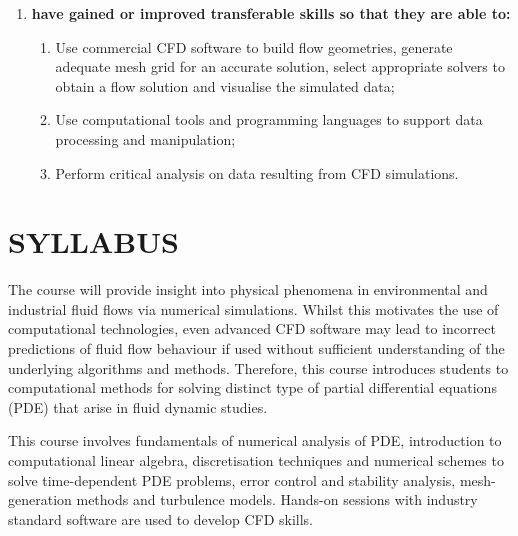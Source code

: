 \documentclass[12pts,a4paper,amsmath,amssymb,floatfix]{article}%
\begin{document}
\begin{enumerate}[{\bf A.}]
%
\item {\bf have gained or improved transferable skills so that they are able to:}
  \begin{enumerate}
    \item Use commercial CFD software to build flow geometries, generate adequate mesh grid for an accurate solution, select appropriate solvers to obtain a flow solution and visualise the simulated data;
    \item Use computational tools and programming languages to support data processing and manipulation; 
    \item Perform critical analysis on data resulting from CFD simulations.
  \end{enumerate}
\end{enumerate}


\section{SYLLABUS}
The course will provide insight into physical phenomena in environmental and industrial fluid flows via numerical simulations. Whilst this motivates the use of computational technologies, even advanced CFD software may lead to incorrect predictions of fluid flow behaviour if used without sufficient understanding of the underlying algorithms and methods. Therefore, this course introduces students to computational methods for solving distinct type of partial differential equations (PDE) that arise in fluid dynamic studies.

This course involves fundamentals of numerical analysis of PDE, introduction to computational linear algebra, discretisation techniques and numerical schemes to solve time-dependent PDE problems, error control and stability analysis, mesh-generation methods and turbulence models. Hands-on sessions with industry standard software are used to develop CFD skills.
\end{document}
